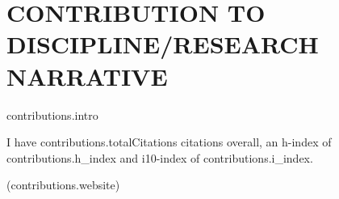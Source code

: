 \section{CONTRIBUTION TO DISCIPLINE/RESEARCH NARRATIVE}
{{contributions.intro}}



\noindent I have {{contributions.totalCitations}} citations overall, an h-index of {{contributions.h_index}} and i10-index of {{contributions.i_index}}.

\noindent ({{contributions.website}})